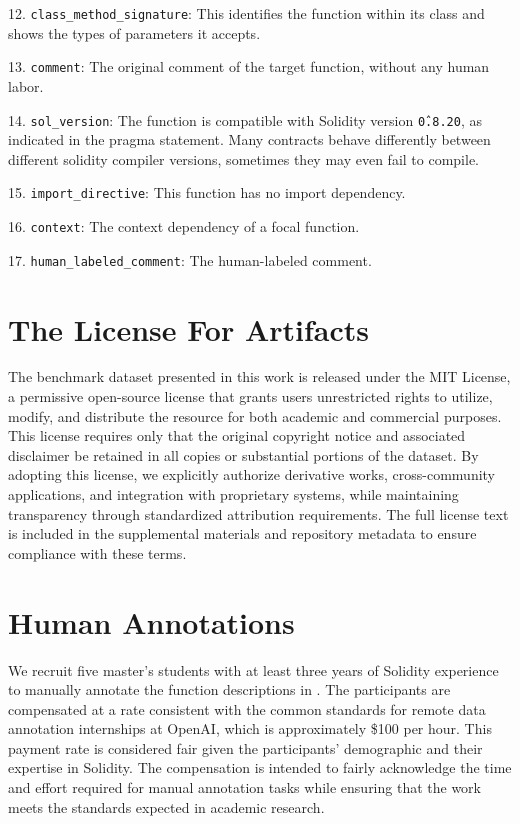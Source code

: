 12. \texttt{class\_method\_signature}: This identifies the function within its class and shows the types of parameters it accepts.

13. \texttt{comment}: The original comment of the target function, without any human labor.

14. \texttt{sol\_version}: The function is compatible with Solidity version \texttt{\^0.8.20}, as indicated in the pragma statement. Many contracts behave differently between different solidity compiler versions, sometimes they may even fail to compile.

15. \texttt{import\_directive}: This function has no import dependency.

16. \texttt{context}: The context dependency of a focal function.

17. \texttt{human\_labeled\_comment}: The human-labeled comment.



\section{The License For Artifacts}
\label{sec:license}
The benchmark dataset presented in this work is released under the MIT License, a permissive open-source license that grants users unrestricted rights to utilize, modify, and distribute the resource for both academic and commercial purposes. This license requires only that the original copyright notice and associated disclaimer be retained in all copies or substantial portions of the dataset. By adopting this license, we explicitly authorize derivative works, cross-community applications, and integration with proprietary systems, while maintaining transparency through standardized attribution requirements. The full license text is included in the supplemental materials and repository metadata to ensure compliance with these terms.


\section{Human Annotations}
We recruit five master's students with at least three years of Solidity experience to manually annotate the function descriptions in \datasetname. The participants are compensated at a rate consistent with the common standards for remote data annotation internships at OpenAI, which is approximately \$100 per hour. This payment rate is considered fair given the participants' demographic and their expertise in Solidity. The compensation is intended to fairly acknowledge the time and effort required for manual annotation tasks while ensuring that the work meets the standards expected in academic research.


